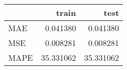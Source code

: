 \begin{tabular}{lrr}
\toprule
{} &      train &       test \\
\midrule
MAE  &   0.041380 &   0.041380 \\
MSE  &   0.008281 &   0.008281 \\
MAPE &  35.331062 &  35.331062 \\
\bottomrule
\end{tabular}
